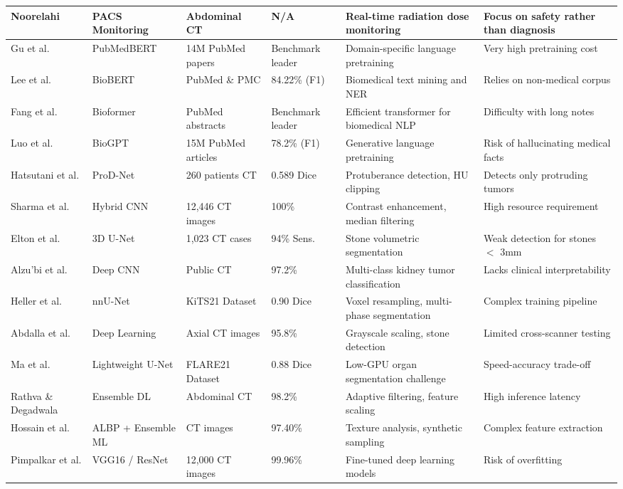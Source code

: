 \documentclass[preprint,12pt]{elsarticle}
\begin{document}
\begin{longtable}{|L{2.2cm}|L{2.8cm}|L{1.8cm}|L{1.8cm}|L{2.8cm}|L{2.2cm}|}
\hline
Noorelahi \cite{noorelahi2025role} & PACS Monitoring & Abdominal CT & N/A & Real-time radiation dose monitoring & Focus on safety rather than diagnosis \\
\hline
Gu et al. \cite{gu2021domain} & PubMedBERT & 14M PubMed papers & Benchmark leader & Domain-specific language pretraining & Very high pretraining cost \\
\hline
Lee et al. \cite{lee2020biobert} & BioBERT & PubMed \& PMC & 84.22\% (F1) & Biomedical text mining and NER & Relies on non-medical corpus \\
\hline
Fang et al. \cite{fang2023bioformer} & Bioformer & PubMed abstracts & Benchmark leader & Efficient transformer for biomedical NLP & Difficulty with long notes \\
\hline
Luo et al. \cite{luo2022biogpt} & BioGPT & 15M PubMed articles & 78.2\% (F1) & Generative language pretraining & Risk of hallucinating medical facts \\
\hline
Hatsutani et al. \cite{hatsutani2023segmentation} & ProD-Net & 260 patients CT & 0.589 Dice & Protuberance detection, HU clipping & Detects only protruding tumors \\
\hline
Sharma et al. \cite{sharma2025hybrid} & Hybrid CNN & 12,446 CT images & 100\% & Contrast enhancement, median filtering & High resource requirement \\
\hline
Elton et al. \cite{elton2022deep} & 3D U-Net & 1,023 CT cases & 94\% Sens. & Stone volumetric segmentation & Weak detection for stones $<$ 3mm \\
\hline
Alzu'bi et al. \cite{alzubi2022kidney} & Deep CNN & Public CT & 97.2\% & Multi-class kidney tumor classification & Lacks clinical interpretability \\
\hline
Heller et al. \cite{heller2023kits21} & nnU-Net & KiTS21 Dataset & 0.90 Dice & Voxel resampling, multi-phase segmentation & Complex training pipeline \\
\hline
Abdalla et al. \cite{abdalla2025kidney} & Deep Learning & Axial CT images & 95.8\% & Grayscale scaling, stone detection & Limited cross-scanner testing \\
\hline
Ma et al. \cite{ma2022fast} & Lightweight U-Net & FLARE21 Dataset & 0.88 Dice & Low-GPU organ segmentation challenge & Speed-accuracy trade-off \\
\hline
Rathva \& Degadwala \cite{rathva2025ensemble} & Ensemble DL & Abdominal CT & 98.2\% & Adaptive filtering, feature scaling & High inference latency \\
\hline
Hossain et al. \cite{hossain2024adaptive} & ALBP + Ensemble ML & CT images & 97.40\% & Texture analysis, synthetic sampling & Complex feature extraction \\
\hline
Pimpalkar et al. \cite{pimpalkar2025fine} & VGG16 / ResNet & 12,000 CT images & 99.96\% & Fine-tuned deep learning models & Risk of overfitting \\
\bottomrule
\end{longtable}
\end{document}
